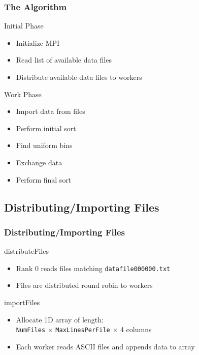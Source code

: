 \documentclass{beamer}
\begin{document}
\begin{frame}	
	\frametitle{The Algorithm}
	
	\begin{block}{Initial Phase}
		\begin{itemize}
			\item Initialize MPI
			\item Read list of available data files
			\item Distribute available data files to workers
		\end{itemize}
	\end{block}
	
	\begin{block}{Work Phase}
		\begin{itemize}
			\item Import data from files
			\item Perform initial sort
			\item Find uniform bins
			\item Exchange data
			\item Perform final sort
		\end{itemize}
	\end{block}
\end{frame}

\subsection{Distributing/Importing Files}

\begin{frame}	
	\frametitle{Distributing/Importing Files}
	
	\begin{block}{distributeFiles}
		\begin{itemize}
			\item Rank 0 reads files matching \texttt{datafile000000.txt}
			\item Files are distributed round robin to workers
		\end{itemize}
	\end{block}
	
	\begin{block}{importFiles}
		\begin{itemize}
			\item Allocate 1D array of length: \\ \texttt{NumFiles} $\times$ \texttt{MaxLinesPerFile} $\times$ 4 columns
			\item Each worker reads ASCII files and appends data to array
		\end{itemize}
	\end{block}
\end{frame}
\end{document}

